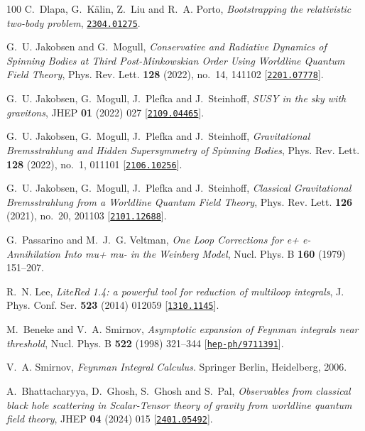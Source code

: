 \begin{thebibliography}{100}
C.~Dlapa, G.~K\"alin, Z.~Liu and R.~A. Porto,  {\em {Bootstrapping the
  relativistic two-body problem}},
  \href{http://www.arXiv.org/abs/2304.01275}{{\tt 2304.01275}}.

G.~U. Jakobsen and G.~Mogull,  {\em {Conservative and Radiative Dynamics of
  Spinning Bodies at Third Post-Minkowskian Order Using Worldline Quantum Field
  Theory}}, Phys. Rev. Lett. {\bf 128} (2022), no.~14, 141102
  [\href{http://www.arXiv.org/abs/2201.07778}{{\tt 2201.07778}}].

G.~U. Jakobsen, G.~Mogull, J.~Plefka and J.~Steinhoff,  {\em {SUSY in the sky
  with gravitons}}, JHEP {\bf 01} (2022) 027
  [\href{http://www.arXiv.org/abs/2109.04465}{{\tt 2109.04465}}].

G.~U. Jakobsen, G.~Mogull, J.~Plefka and J.~Steinhoff,  {\em {Gravitational
  Bremsstrahlung and Hidden Supersymmetry of Spinning Bodies}}, Phys. Rev.
  Lett. {\bf 128} (2022), no.~1, 011101
  [\href{http://www.arXiv.org/abs/2106.10256}{{\tt 2106.10256}}].

G.~U. Jakobsen, G.~Mogull, J.~Plefka and J.~Steinhoff,  {\em {Classical
  Gravitational Bremsstrahlung from a Worldline Quantum Field Theory}}, Phys.
  Rev. Lett. {\bf 126} (2021), no.~20, 201103
  [\href{http://www.arXiv.org/abs/2101.12688}{{\tt 2101.12688}}].

G.~Passarino and M.~J.~G. Veltman,  {\em {One Loop Corrections for e+ e-
  Annihilation Into mu+ mu- in the Weinberg Model}}, Nucl. Phys. B {\bf 160}
  (1979) 151--207.

R.~N. Lee,  {\em {LiteRed 1.4: a powerful tool for reduction of multiloop
  integrals}}, J. Phys. Conf. Ser. {\bf 523} (2014) 012059
  [\href{http://www.arXiv.org/abs/1310.1145}{{\tt 1310.1145}}].

M.~Beneke and V.~A. Smirnov,  {\em {Asymptotic expansion of Feynman integrals
  near threshold}}, Nucl. Phys. B {\bf 522} (1998) 321--344
  [\href{http://www.arXiv.org/abs/hep-ph/9711391}{{\tt hep-ph/9711391}}].

V.~A. Smirnov, {\em Feynman Integral Calculus}.
\newblock Springer Berlin, Heidelberg, 2006.

A.~Bhattacharyya, D.~Ghosh, S.~Ghosh and S.~Pal,  {\em {Observables from
  classical black hole scattering in Scalar-Tensor theory of gravity from
  worldline quantum field theory}}, JHEP {\bf 04} (2024) 015
  [\href{http://www.arXiv.org/abs/2401.05492}{{\tt 2401.05492}}].


\end{thebibliography}
